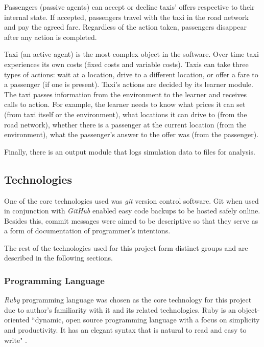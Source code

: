 Passengers (passive agents) can accept or decline taxis' offers respective to
their internal state. If accepted, passengers travel with the taxi in the road
network and pay the agreed fare. Regardless of the action taken, passengers
disappear after any action is completed.

Taxi (an active agent) is the most complex object in the software. Over time
taxi experiences its own costs (fixed costs and variable costs). Taxis can take
three types of actions: wait at a location, drive to a different location, or
offer a fare to a passenger (if one is present). Taxi's actions are decided by
its learner module. The taxi passes information from the environment to the
learner and receives calls to action. For example, the learner needs to know
what prices it can set (from taxi itself or the environment), what locations it
can drive to (from the road network), whether there is a passenger at the
current location (from the environment), what the passenger's answer to the
offer was (from the passenger).

Finally, there is an output module that logs simulation data to files for
analysis.


\subsection{Technologies}

One of the core technologies used was \textit{git} \parencite{Git} version
control software. Git when used in conjunction with \textit{GitHub}
\parencite{Github} enabled easy code backups to be hosted safely online.
Besides this, commit messages were aimed to be descriptive so that they serve
as a form of documentation of programmer's intentions.

The rest of the technologies used for this project form distinct groups and are
described in the following sections.

\subsubsection{Programming Language}

\textit{Ruby} programming language was chosen as the core technology for this
project due to author's familiarity with it and its related technologies. Ruby
is an object-oriented ``dynamic, open source programming language with a focus
on simplicity and productivity. It has an elegant syntax that is natural to
read and easy to write" \parencite{Ruby}.

